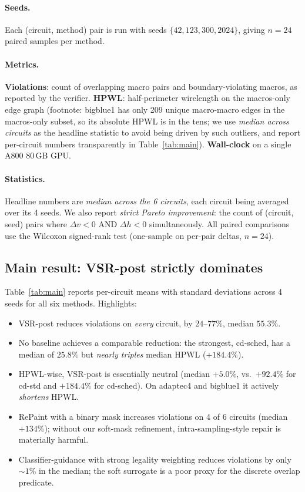 \documentclass{article}
\begin{document}
\paragraph{Seeds.}  Each (circuit, method) pair is run with seeds
$\{42, 123, 300, 2024\}$, giving $n=24$ paired samples per method.

\paragraph{Metrics.}
\textbf{Violations}: count of overlapping macro pairs and boundary-violating
macros, as reported by the verifier.
\textbf{HPWL}: half-perimeter wirelength on the macros-only edge graph
(footnote: bigblue1 has only 209 unique macro-macro edges in the macros-only
subset, so its absolute HPWL is in the tens; we use \emph{median across
circuits} as the headline statistic to avoid being driven by such outliers,
and report per-circuit numbers transparently in Table~\ref{tab:main}).
\textbf{Wall-clock} on a single A800 80\,GB GPU.

\paragraph{Statistics.}  Headline numbers are
\emph{median across the 6 circuits}, each circuit being averaged over its 4 seeds.
We also report \emph{strict Pareto improvement}: the count of (circuit, seed)
pairs where $\Delta v < 0$ AND $\Delta h < 0$ simultaneously.  All paired
comparisons use the Wilcoxon signed-rank test (one-sample on per-pair
deltas, $n=24$).

\subsection{Main result: VSR-post strictly dominates}
\label{sec:main_result}

Table~\ref{tab:main} reports per-circuit means with standard deviations across
4 seeds for all six methods.  Highlights:
\begin{itemize}
\item VSR-post reduces violations on \emph{every} circuit, by $24$--$77\%$,
median $55.3\%$.
\item No baseline achieves a comparable reduction: the strongest, cd-sched,
has a median of $25.8\%$ but \emph{nearly triples} median HPWL ($+184.4\%$).
\item HPWL-wise, VSR-post is essentially neutral (median $+5.0\%$, vs.\
$+92.4\%$ for cd-std and $+184.4\%$ for cd-sched).  On adaptec4 and bigblue1
it actively \emph{shortens} HPWL.
\item RePaint with a binary mask increases violations on 4 of 6 circuits (median $+134\%$); without our soft-mask refinement, intra-sampling-style repair is materially harmful.
\item Classifier-guidance with strong legality weighting reduces violations
by only $\sim 1\%$ in the median; the soft surrogate is a poor proxy for the
discrete overlap predicate.
\end{itemize}
\end{document}
